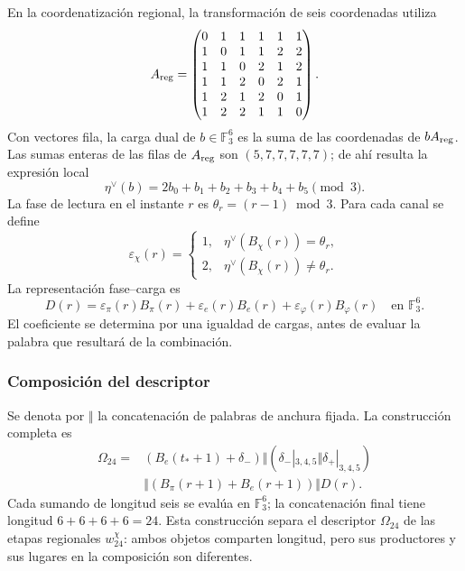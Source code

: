 En la coordenatización regional, la transformación de seis coordenadas utiliza
\[
 A_{\rm reg}=
 \begin{pmatrix}
 0&1&1&1&1&1\\
 1&0&1&1&2&2\\
 1&1&0&2&1&2\\
 1&1&2&0&2&1\\
 1&2&1&2&0&1\\
 1&2&2&1&1&0
 \end{pmatrix}.
\]
Con vectores fila, la carga dual de $b\in\mathbb F_3^6$ es la suma
de las coordenadas de $bA_{\rm reg}$. Las sumas enteras de las filas de
$A_{\rm reg}$ son $(5,7,7,7,7,7)$; de ahí resulta la expresión local
\begin{equation}
 \eta^\vee(b)=2b_0+b_1+b_2+b_3+b_4+b_5\pmod3.
 \label{act21:eq:kdes-cargadual}
\end{equation}
La fase de lectura en el instante $r$ es
$\theta_r=(r-1)\bmod3$. Para cada canal se define
\[
 \varepsilon_\chi(r)=
 \begin{cases}
 1,&\eta^\vee(B_\chi(r))=\theta_r,\\
 2,&\eta^\vee(B_\chi(r))\ne\theta_r.
 \end{cases}
\]
La representación fase--carga es
\begin{equation}
 D(r)=\varepsilon_\pi(r)B_\pi(r)
      +\varepsilon_e(r)B_e(r)
      +\varepsilon_\varphi(r)B_\varphi(r)
      \quad\text{en }\mathbb F_3^6.
 \label{act21:eq:kdes-fasecarga}
\end{equation}
El coeficiente se determina por una igualdad de cargas, antes de evaluar
la palabra que resultará de la combinación.

\subsubsection{Composición del descriptor}

Se denota por $\Vert$ la concatenación de palabras de anchura fijada.
La construcción completa es
\begin{equation}
 \begin{split}
 \Omega_{24}={}&
 (B_e(t_*+1)+\delta_-)
 \Vert (\delta_-|_{3,4,5}\Vert\delta_+|_{3,4,5})\\
 &\Vert(B_\pi(r+1)+B_e(r+1))\Vert D(r).
 \end{split}
 \label{act21:eq:kdes-omega}
\end{equation}
Cada sumando de longitud seis se evalúa en $\mathbb F_3^6$; la
concatenación final tiene longitud $6+6+6+6=24$. Esta construcción
separa el descriptor $\Omega_{24}$ de las etapas regionales
$w_{24}^{\chi}$: ambos objetos comparten longitud, pero sus productores
y sus lugares en la composición son diferentes.

